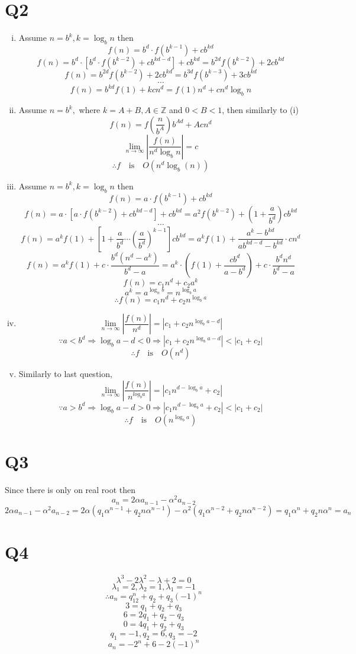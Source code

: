 \documentclass[12pt]{article}
\begin{document}
\section{Q2}
\begin{enumerate}[(i)]
\item Assume $n=b^k,k=\log_bn$ then 
$$f(n)=b^d\cdot f(b^{k-1})+cb^{kd}$$
$$f(n)=b^d\cdot[b^d\cdot f(b^{k-2})+cb^{kd-d}]+cb^{kd}=b^{2d}f(b^{k-2})+2cb^{kd}$$
$$f(n)=b^{2d}f(b^{k-2})+2cb^{kd}=b^{3d}f(b^{k-3})+3cb^{kd}$$
$$\cdots$$
$$f(n)=b^{kd}f(1)+kcn^d=f(1)n^d+cn^d\log_bn$$
\item Assume $n=b^k,$ where $k=A+B,A\in\mathbb{Z}$ and $0<B<1$, then similarly to (i)
$$f(n)=f(\frac{n}{b^A})b^{Ad}+Acn^d$$
$$\lim_{n\to\infty}|\frac{f(n)}{n^d\log_bn}|=c$$
$$\therefore f\quad\mathrm{is}\quad O(n^d\log_b(n))$$ 
\item Assume $n=b^k,k=\log_bn$ then
$$f(n)=a\cdot f(b^{k-1})+cb^{kd}$$
$$f(n)=a\cdot[a\cdot f(b^{k-2})+cb^{kd-d}]+cb^{kd}=a^2f(b^{k-2})+(1+\frac{a}{b^d})cb^{kd}$$
$$\cdots$$
$$f(n)=a^kf(1)+[1+\frac{a}{b^d}\cdots(\frac{a}{b^d})^{k-1}]cb^{kd}=a^kf(1)+\frac{a^k-b^{kd}}{ab^{kd-d}-b^{kd}}\cdot cn^d$$
$$f(n)=a^kf(1)+c\cdot\frac{b^d(n^d-a^k)}{b^d-a}=a^k\cdot(f(1)+\frac{cb^d}{a-b^d})+c\cdot\frac{b^dn^d}{b^d-a}$$
$$f(n)=c_1n^d+c_2a^k$$
$$a^k=a^{\log_nb}=n^{\log_ba}$$
$$\therefore f(n)=c_1n^d+c_2n^{\log_ba}$$
\item $$\lim_{n\to\infty}|\frac{f(n)}{n^d}|=|c_1+c_2n^{\log_ba-d}|$$
$$\because a<b^d\Rightarrow\log_ba-d<0\Rightarrow|c_1+c_2n^{\log_ba-d}|<|c_1+c_2|$$
$$\therefore f\quad\mathrm{ is }\quad O(n^d)$$
\item Similarly to last question,
$$\lim_{n\to\infty}|\frac{f(n)}{n^{log_ba}}|=|c_1n^{d-\log_ba}+c_2|$$
$$\because a>b^d\Rightarrow\log_ba-d>0\Rightarrow|c_1n^{d-\log_ba}+c_2|<|c_1+c_2|$$
$$\therefore f\quad\mathrm{ is }\quad O(n^{\log_ba})$$
\end{enumerate}
\section{Q3}
Since there is only on real root then 
$$a_n=2\alpha a_{n-1}-\alpha^2a_{n-2}$$
$$2\alpha a_{n-1}-\alpha^2a_{n-2}=2\alpha(q_1\alpha^{n-1}+q_2n\alpha^{n-1})-\alpha^2(q_1\alpha^{n-2}+q_2n\alpha^{n-2})=q_1\alpha^n+q_2n\alpha^n=a_n$$
\section{Q4}
$$\lambda^3-2\lambda^2-\lambda+2=0$$
$$\lambda_1=2,\lambda_2=1,\lambda_1=-1$$
$$\therefore a_n=q_12^n+q_2+q_3(-1)^n$$
$$3=q_1+q_2+q_3$$
$$6=2q_1+q_2-q_3$$
$$0=4q_1+q_2+q_3$$
$$q_1=-1,q_2=6,q_3=-2$$
$$a_n=-2^n+6-2(-1)^n$$
\end{document}

